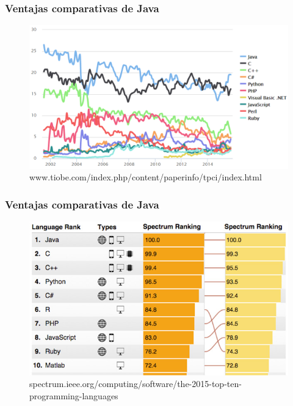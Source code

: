 \documentclass{beamer}
\begin{document}


\begin{frame}
\frametitle{Ventajas comparativas de Java}
\begin{figure}[!hbp]
\begin{center}
\includegraphics[scale=0.33,angle=0]{images/ranking_tiobe.PNG}
\caption{www.tiobe.com/index.php/content/paperinfo/tpci/index.html}
\label{Diagrama general del sistema}
\end{center}
\end{figure}
\end{frame}



\begin{frame}
\frametitle{Ventajas comparativas de Java}
\begin{figure}[!hbp]
\begin{center}
\includegraphics[scale=0.3,angle=0]{images/ranking_spectrum.jpg}
\caption{spectrum.ieee.org/computing/software/the-2015-top-ten-programming-languages}
\label{Diagrama general del sistema}
\end{center}
\end{figure}
\end{frame}
\end{document}
